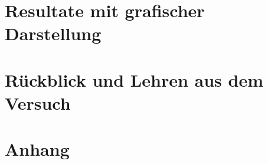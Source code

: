 \documentclass{article}[11pt,paper=A4, margin=1cm]
\begin{document}
\section {Resultate mit grafischer Darstellung}

\newpage
\section {Rückblick und Lehren aus dem Versuch}

\newpage


\appendix
\section {Anhang}


\newpage
\listoffigures

\newpage

\printbibliography
\end{document}
